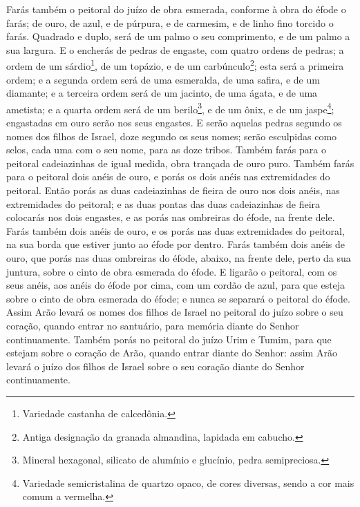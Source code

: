 Farás também o peitoral do juízo de obra esmerada, conforme à
obra do éfode o farás; de ouro, de azul, e de púrpura, e de
carmesim, e de linho fino torcido o farás. Quadrado e duplo,
será de um palmo o seu comprimento, e de um palmo a sua largura.
E o encherás de pedras de engaste, com quatro ordens de
pedras; a ordem de um sárdio\footnote{Variedade castanha de
calcedônia.}, de um topázio, e de um carbúnculo\footnote{Antiga
designação da granada almandina, lapidada em cabucho.}; esta será a
primeira ordem; e a segunda ordem será de uma esmeralda, de
uma safira, e de um diamante; e a terceira ordem será de um
jacinto, de uma ágata, e de uma ametista; e a quarta ordem
será de um berilo\footnote{Mineral hexagonal, silicato de alumínio e
glucínio, pedra semipreciosa.}, e de um ônix, e de um
jaspe\footnote{Variedade semicristalina de quartzo opaco, de cores
diversas, sendo a cor mais comum a vermelha.}; engastadas em ouro
serão nos seus engastes. E serão aquelas pedras segundo os
nomes dos filhos de Israel, doze segundo os seus nomes; serão
esculpidas como selos, cada uma com o seu nome, para as doze tribos.
Também farás para o peitoral cadeiazinhas de igual medida,
obra trançada de ouro puro. Também farás para o peitoral dois
anéis de ouro, e porás os dois anéis nas extremidades do peitoral.
Então porás as duas cadeiazinhas de fieira de ouro nos dois
anéis, nas extremidades do peitoral; e as duas pontas das
duas cadeiazinhas de fieira colocarás nos dois engastes, e as porás
nas ombreiras do éfode, na frente dele. Farás também dois
anéis de ouro, e os porás nas duas extremidades do peitoral, na sua
borda que estiver junto ao éfode por dentro. Farás também
dois anéis de ouro, que porás nas duas ombreiras do éfode, abaixo,
na frente dele, perto da sua juntura, sobre o cinto de obra esmerada
do éfode. E ligarão o peitoral, com os seus anéis, aos anéis
do éfode por cima, com um cordão de azul, para que esteja sobre o
cinto de obra esmerada do éfode; e nunca se separará o peitoral do
éfode. Assim Arão levará os nomes dos filhos de Israel no
peitoral do juízo sobre o seu coração, quando entrar no santuário,
para memória diante do Senhor continuamente. Também porás no
peitoral do juízo Urim e Tumim, para que estejam sobre o coração de
Arão, quando entrar diante do Senhor: assim Arão levará o juízo dos
filhos de Israel sobre o seu coração diante do Senhor continuamente.

